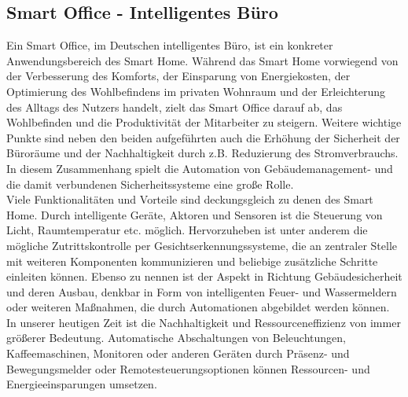     \subsection{Smart Office - Intelligentes Büro}
    \label{subsec:smartoffice}
        Ein Smart Office, im Deutschen intelligentes Büro, ist ein konkreter Anwendungsbereich des Smart Home. 
        Während das Smart Home vorwiegend von der Verbesserung des Komforts, der Einsparung von Energiekosten,  
        der Optimierung des Wohlbefindens im privaten Wohnraum und der Erleichterung des Alltags des Nutzers handelt, 
        zielt das Smart Office darauf ab, das Wohlbefinden und die Produktivität der Mitarbeiter zu steigern. Weitere 
        wichtige Punkte sind neben den beiden aufgeführten auch die Erhöhung der Sicherheit der Büroräume und der 
        Nachhaltigkeit durch z.B. Reduzierung des Stromverbrauchs. In diesem Zusammenhang spielt die Automation 
        von Gebäudemanagement- und die damit verbundenen Sicherheitssysteme eine große Rolle. 
        \\
        \linebreak
        Viele Funktionalitäten und Vorteile sind deckungsgleich zu denen des Smart Home. Durch intelligente Geräte, Aktoren und 
        Sensoren ist die Steuerung von Licht, Raumtemperatur etc. möglich. Hervorzuheben ist unter anderem die mögliche Zutrittskontrolle 
        per Gesichtserkennungssysteme, die an zentraler Stelle mit weiteren Komponenten kommunizieren und beliebige zusätzliche Schritte 
        einleiten können. Ebenso zu nennen ist der Aspekt in Richtung Gebäudesicherheit und deren Ausbau, denkbar in Form von intelligenten 
        Feuer- und Wassermeldern oder weiteren Maßnahmen, die durch Automationen abgebildet werden können. 
        \\
        In unserer heutigen Zeit ist die Nachhaltigkeit und Ressourceneffizienz von immer größerer Bedeutung.
        Automatische Abschaltungen von Beleuchtungen, Kaffeemaschinen, Monitoren oder anderen Geräten durch 
        Präsenz- und Bewegungsmelder oder Remotesteuerungsoptionen können Ressourcen- und Energieeinsparungen umsetzen. 
        
